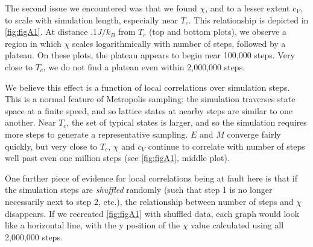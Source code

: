 \documentclass[letter,scriptaddress,twocolumn, prl,nofootinbib]{revtex4}
\begin{document}
The second issue we encountered was that we found $\chi$, and to a lesser extent $c_V$, to scale with simulation length, especially near $T_c$. This relationship is depicted in \autoref{fig:figA1}. At distance $.1 J/k_B$ from $T_c$ (top and bottom plots), we observe a region in which $\chi$ scales logarithmically with number of steps, followed by a plateau. On these plots, the plateau appears to begin near 100,000 steps. Very close to $T_c$, we do not find a plateau even within 2,000,000 steps.

We believe this effect is a function of local correlations over simulation steps. This is a normal feature of Metropolis sampling: the simulation traverses state space at a finite speed, and so lattice states at nearby steps are similar to one another. Near $T_c$, the set of typical states is larger, and so the simulation requires more steps to generate a representative sampling. $E$ and $M$ converge fairly quickly, but very close to $T_c$, $\chi$ and $c_V$ continue to correlate with number of steps well past even one million steps (see \autoref{fig:figA1}, middle plot).

One further piece of evidence for local correlations being at fault here is that if the simulation steps are \textit{shuffled} randomly (such that step 1 is no longer necessarily next to step 2, etc.), the relationship between number of steps and $\chi$ disappears. If we recreated \autoref{fig:figA1} with shuffled data, each graph would look like a horizontal line, with the y position of the $\chi$ value calculated using all 2,000,000 steps.
\end{document}
